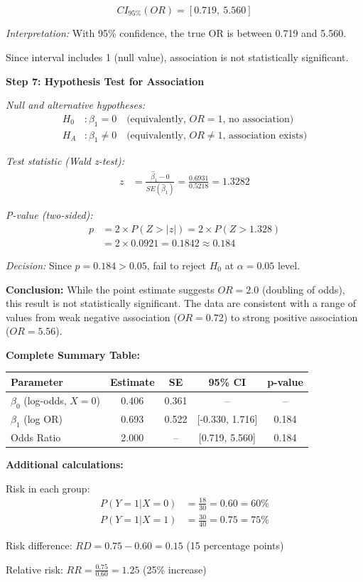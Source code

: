 \documentclass[12pt]{article}
\begin{document}
\begin{solution}
\[
\boxed{CI_{95\%}(OR) = [0.719, \ 5.560]}
\]

\textit{Interpretation:} With 95\% confidence, the true OR is between 0.719 and 5.560.

Since interval includes 1 (null value), association is not statistically significant.

\textbf{Step 7: Hypothesis Test for Association}

\textit{Null and alternative hypotheses:}
\begin{align*}
H_0&: \beta_1 = 0 \quad \text{(equivalently, } OR = 1 \text{, no association)} \\
H_A&: \beta_1 \neq 0 \quad \text{(equivalently, } OR \neq 1 \text{, association exists)}
\end{align*}

\textit{Test statistic (Wald z-test):}
\begin{align*}
z &= \frac{\hat{\beta}_1 - 0}{SE(\hat{\beta}_1)} = \frac{0.6931}{0.5218} = 1.3282
\end{align*}

\textit{P-value (two-sided):}
\begin{align*}
p &= 2 \times P(Z > |z|) = 2 \times P(Z > 1.328) \\
&= 2 \times 0.0921 = 0.1842 \approx 0.184
\end{align*}

\textit{Decision:} Since $p = 0.184 > 0.05$, fail to reject $H_0$ at $\alpha = 0.05$ level.

\textbf{Conclusion:} While the point estimate suggests $OR = 2.0$ (doubling of odds), this result is not statistically significant. The data are consistent with a range of values from weak negative association ($OR = 0.72$) to strong positive association ($OR = 5.56$).

\textbf{Complete Summary Table:}

\begin{center}
\begin{tabular}{|l|c|c|c|c|}
\hline
\textbf{Parameter} & \textbf{Estimate} & \textbf{SE} & \textbf{95\% CI} & \textbf{p-value} \\
\hline
$\beta_0$ (log-odds, $X=0$) & 0.406 & 0.361 & -- & -- \\
$\beta_1$ (log OR) & 0.693 & 0.522 & [-0.330, 1.716] & 0.184 \\
Odds Ratio & 2.000 & -- & [0.719, 5.560] & 0.184 \\
\hline
\end{tabular}
\end{center}

\textbf{Additional calculations:}

Risk in each group:
\begin{align*}
P(Y=1|X=0) &= \frac{18}{30} = 0.60 = 60\% \\
P(Y=1|X=1) &= \frac{30}{40} = 0.75 = 75\%
\end{align*}

Risk difference: $RD = 0.75 - 0.60 = 0.15$ (15 percentage points)

Relative risk: $RR = \frac{0.75}{0.60} = 1.25$ (25\% increase)
\end{solution}
\end{document}
